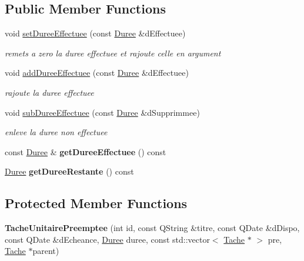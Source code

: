 \subsection*{Public Member Functions}
\begin{DoxyCompactItemize}
\item 
void \hyperlink{class_tache_unitaire_preemptee_a4061516eb33059f302d5ebe1ad580e2d}{set\+Duree\+Effectuee} (const \hyperlink{class_duree}{Duree} \&d\+Effectuee)
\begin{DoxyCompactList}\small\item\em remets a zero la duree effectuee et rajoute celle en argument \end{DoxyCompactList}\item 
void \hyperlink{class_tache_unitaire_preemptee_af30a0fd0691b514d356321a45c57661c}{add\+Duree\+Effectuee} (const \hyperlink{class_duree}{Duree} \&d\+Effectuee)
\begin{DoxyCompactList}\small\item\em rajoute la duree effectuee \end{DoxyCompactList}\item 
void \hyperlink{class_tache_unitaire_preemptee_a1151a6443d9692a6a01f78dcb490aa4a}{sub\+Duree\+Effectuee} (const \hyperlink{class_duree}{Duree} \&d\+Supprimmee)
\begin{DoxyCompactList}\small\item\em enleve la duree non effectuee \end{DoxyCompactList}\item 
\hypertarget{class_tache_unitaire_preemptee_a9e2e18ad2e951c52fd66ab4a9e7937f7}{}const \hyperlink{class_duree}{Duree} \& {\bfseries get\+Duree\+Effectuee} () const \label{class_tache_unitaire_preemptee_a9e2e18ad2e951c52fd66ab4a9e7937f7}

\item 
\hypertarget{class_tache_unitaire_preemptee_a82eb73b30e1cfcbff1a15625637811b0}{}\hyperlink{class_duree}{Duree} {\bfseries get\+Duree\+Restante} () const \label{class_tache_unitaire_preemptee_a82eb73b30e1cfcbff1a15625637811b0}

\end{DoxyCompactItemize}
\subsection*{Protected Member Functions}
\begin{DoxyCompactItemize}
\item 
\hypertarget{class_tache_unitaire_preemptee_afdfea43ca79a7c1ea154499bbeb34af5}{}{\bfseries Tache\+Unitaire\+Preemptee} (int id, const Q\+String \&titre, const Q\+Date \&d\+Dispo, const Q\+Date \&d\+Echeance, \hyperlink{class_duree}{Duree} duree, const std\+::vector$<$ \hyperlink{class_tache}{Tache} $\ast$ $>$ pre, \hyperlink{class_tache}{Tache} $\ast$parent)\label{class_tache_unitaire_preemptee_afdfea43ca79a7c1ea154499bbeb34af5}

\end{DoxyCompactItemize}
